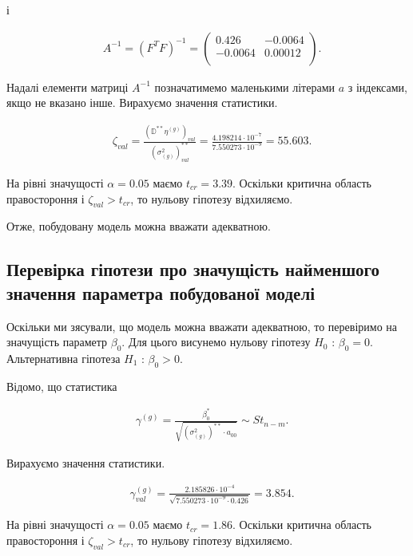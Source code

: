 \documentclass[14pt,a4paper]{scrartcl}
\theoremstyle{definition}
\theoremstyle{remark}
\theoremstyle{definition}
\theoremstyle{definition}
\begin{document}
і

\begin{align*}
  & A^{-1} = (F^{T}F)^{-1} = \begin{pmatrix}
    0.426 & -0.0064 \\
    -0.0064 & 0.00012  \\
  \end{pmatrix}.
\end{align*}

Надалі елементи матриці $A^{-1}$ позначатимемо маленькими літерами $a$ з індексами, якщо не вказано інше. Вирахуємо значення статистики.

\begin{align*}
  & \zeta_{val} = \frac{(\mathbb{D}^{**}\eta^{(g)})_{val}}{(\sigma_{(g)}^2)^{**}_{val}} = \frac{4.198214 \cdot 10^{-7}}{7.550273 \cdot 10^{-9}} = 55.603.
\end{align*}

На рівні значущості $\alpha = 0.05$ маємо $t_{cr} = 3.39$. Оскільки критична область правостороння і $\zeta_{val} > t_{cr}$, то нульову гіпотезу відхиляємо.

Отже, побудовану модель можна вважати адекватною.

\subsection{Перевірка гіпотези про значущість найменшого значення параметра побудованої моделі}

Оскільки ми з\textquotesingle ясували, що модель можна вважати адекватною, то перевіримо на значущість параметр $\beta_{0}$. Для цього висунемо нульову гіпотезу $H_{0}$ : $\beta_{0} = 0$. Альтернативна гіпотеза $H_{1}$ : $\beta_{0} > 0$.

Відомо, що статистика

\begin{align*}
  & \gamma^{(g)} = \frac{\beta_{0}^{*}}{\sqrt{(\sigma_{(g)}^2)^{**}\cdot a_{00}}} \sim St_{n - m}.
\end{align*}

Вирахуємо значення статистики.

\begin{align*}
  & \gamma^{(g)}_{val} = \frac{2.185826 \cdot 10^{-4}}{\sqrt{7.550273 \cdot 10^{-9} \cdot 0.426}} = 3.854.
\end{align*}

На рівні значущості $\alpha = 0.05$ маємо $t_{cr} = 1.86$. Оскільки критична область правостороння і $\zeta_{val} > t_{cr}$, то нульову гіпотезу відхиляємо.
\end{document}
